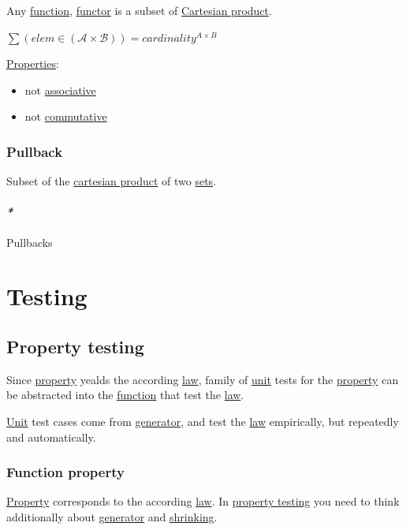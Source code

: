 \documentclass[a4paper,14pt,oneside]{book}
\begin{document}
Any \hyperref[orgba4b145]{function}, \hyperref[org9e29f59]{functor} is a subset of \hyperref[orgf9af2dd]{Cartesian product}.

\(\sum{(elem \in (\mathcal{A} \times \mathcal{B}))}  = cardinality^{A \times B}\)

\hyperref[org0be48bd]{Properties}:
\begin{itemize}
\item not \hyperref[org5d2a9b6]{associative}
\item not \hyperref[org120fa4d]{commutative}
\end{itemize}

\subsection{\label{orge254857}Pullback}
\label{sec:orgc6ef52b}
Subset of the \hyperref[orgf9af2dd]{cartesian product} of two \hyperref[org8084734]{sets}.

\subsubsection{\emph{*}}
\label{sec:orgb317570}
\label{org530591e}Pullbacks

\chapter{\label{org526fbf9}Testing}
\label{sec:org96fb222}
\section{\label{org9ac8ff6}Property testing}
\label{sec:org8ac2a07}

Since \hyperref[orgc961e31]{property} yealds the according \hyperref[org214a5cb]{law}, family of \hyperref[orgccdcf68]{unit} tests for the \hyperref[orgc961e31]{property} can be abstracted into the \hyperref[orgba4b145]{function} that test the \hyperref[org214a5cb]{law}.

\hyperref[orgccdcf68]{Unit} test cases come from \hyperref[orga9ff459]{generator}, and test the \hyperref[org214a5cb]{law} empirically, but repeatedly and automatically.

\subsection{\label{org79372b4}Function property}
\label{sec:org7e48fcc}

\hyperref[orgc961e31]{Property} corresponds to the according \hyperref[org214a5cb]{law}.
In \hyperref[org9ac8ff6]{property testing} you need to think additionally about \hyperref[orga9ff459]{generator} and \hyperref[org29f0cea]{shrinking}.
\end{document}
